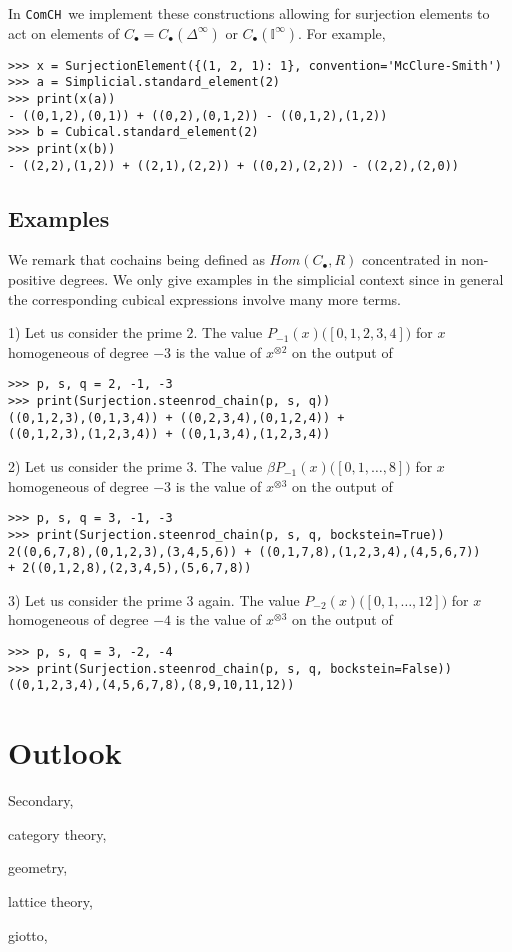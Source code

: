 \documentclass{amsart}
\newcommand{\comch}{\texttt{ComCH}}
\begin{document}
In \comch\, we implement these constructions allowing for surjection elements to act on elements of $C_\bullet = C_\bullet(\Delta^\infty)$ or $C_\bullet(\mathbb I^\infty)$. For example,
\begin{verbatim}
>>> x = SurjectionElement({(1, 2, 1): 1}, convention='McClure-Smith')
>>> a = Simplicial.standard_element(2)
>>> print(x(a))
- ((0,1,2),(0,1)) + ((0,2),(0,1,2)) - ((0,1,2),(1,2))
>>> b = Cubical.standard_element(2)
>>> print(x(b))
- ((2,2),(1,2)) + ((2,1),(2,2)) + ((0,2),(2,2)) - ((2,2),(2,0))
\end{verbatim}

\subsection{Examples}

We remark that cochains being defined as $Hom(C_\bullet, R)$ concentrated in non-positive degrees. We only give examples in the simplicial context since in general the corresponding cubical expressions involve many more terms.

1) Let us consider the prime $2$. The value $P_{-1}(x)\big([0,1,2,3,4]\big)$ for $x$ homogeneous of degree $-3$ is the value of $x^{\otimes 2}$ on the output of
\begin{verbatim}
>>> p, s, q = 2, -1, -3
>>> print(Surjection.steenrod_chain(p, s, q))
((0,1,2,3),(0,1,3,4)) + ((0,2,3,4),(0,1,2,4)) +
((0,1,2,3),(1,2,3,4)) + ((0,1,3,4),(1,2,3,4))
\end{verbatim}

2) Let us consider the prime $3$. The value $\beta P_{-1}(x)\big([0,1,\dots,8]\big)$ for $x$ homogeneous of degree $-3$ is the value of $x^{\otimes 3}$ on the output of
\begin{verbatim}
>>> p, s, q = 3, -1, -3
>>> print(Surjection.steenrod_chain(p, s, q, bockstein=True))
2((0,6,7,8),(0,1,2,3),(3,4,5,6)) + ((0,1,7,8),(1,2,3,4),(4,5,6,7))
+ 2((0,1,2,8),(2,3,4,5),(5,6,7,8))
\end{verbatim}

3) Let us consider the prime $3$ again. The value $P_{-2}(x)\big([0,1,\dots,12]\big)$ for $x$ homogeneous of degree $-4$ is the value of $x^{\otimes 3}$ on the output of
\begin{verbatim}
>>> p, s, q = 3, -2, -4
>>> print(Surjection.steenrod_chain(p, s, q, bockstein=False))
((0,1,2,3,4),(4,5,6,7,8),(8,9,10,11,12))
\end{verbatim}
\section{Outlook}

Secondary,

category theory,

geometry,

lattice theory,

giotto,





\end{document}
